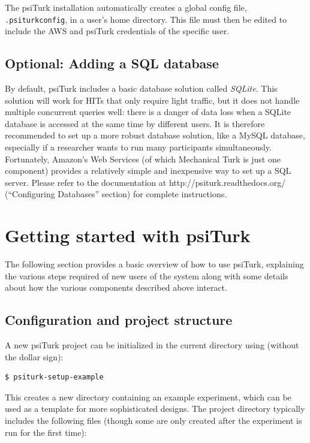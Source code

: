 \documentclass[twocolumn]{svjour3}          %
\newcommand{\psiturk}[0]{\textsf{psiTurk}}
\begin{document}
The \psiturk{} installation automatically creates a global config file, \texttt{.psiturkconfig}, in a user's home directory. 
This file must then be edited to include the AWS and \psiturk{} credentials of the specific user. 

\subsection{Optional: Adding a SQL database}
By default, \psiturk{} includes a basic database solution called \emph{SQLite}. This solution
will work for HITs that only require light traffic, but it does not handle
multiple concurrent queries well: there is a danger of data loss when a SQLite database is 
accessed at the same time by different users. 
It is therefore recommended to set up a more robust database solution, like a
MySQL database, especially if a researcher wants to run many participants simultaneously.
Fortunately, Amazon's Web Services (of which Mechanical Turk is just one component)
provides a relatively simple and inexpensive way to set up a SQL server.  Please refer to
the documentation at \textsf{http://psiturk.readthedocs.org/} (``Configuring Databases'' section)
for complete instructions.

\section{Getting started with \psiturk{}}

The following section provides a basic overview of how to use \psiturk{},
explaining the various steps required of new users of the system along with
some details about how the various components described above interact.

\subsection{Configuration and project structure}

A new \psiturk{} project can be initialized in the current directory using (without the dollar sign):

\begin{lstlisting}
$ psiturk-setup-example
\end{lstlisting}

\noindent This creates a new directory containing an example experiment,
which can be used as a template for more sophisticated designs.
The project directory typically includes the following files (though some are only
created after the experiment is run for the first time):
\end{document}
